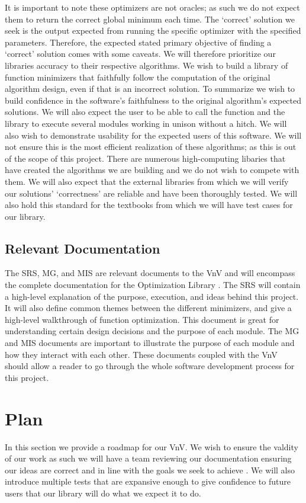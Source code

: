 \documentclass[12pt, titlepage]{article}
\begin{document}
It is important to note these optimizers are not oracles; as such we do not
expect them to return the correct global minimum each time. The `correct' solution we seek is the output expected from running
the specific optimizer with the specified parameters. Therefore, the expected stated primary objective of finding a `correct' 
solution comes with some caveats. We will therefore prioritize our libraries accuracy to their respective algorithms. We wish
to build a library of function minimizers that faithfully follow the computation of the original algorithm design, even if that
is an incorrect solution.  To summarize we wish to build confidence in the software's faithfulness to the original algorithm's 
expected solutions. We will also expect the user to be able to call the function and the library to execute several modules working
in unison without a hitch. 
We will also wish to demonstrate usability for the expected users of this software. We will not ensure this is the most efficient 
realization of these algorithms; as this is out of the scope of this project. There are numerous high-computing libaries that have
created the algorithms we are building and we do not wish to compete with them. We will also expect that the external libraries from 
which we will verify our solutions' `correctness' are reliable and have been thoroughly tested. We will also hold this standard for
the textbooks from which we will have test cases for our library. 


\subsection{Relevant Documentation}
The SRS, MG, and MIS are relevant documents to the VnV and will encompass the complete
documentation for the Optimization Library \citep{SRS}. The SRS will contain a high-level explanation
of the purpose, execution, and ideas behind this project. It will also define common themes
between the different minimizers, and give a high-level walkthrough of function optimization. 
This document is great for understanding certain design decisions and the purpose of each module.
The MG and MIS documents are important to illustrate the purpose of each module and how they
interact with each other. These documents coupled with the VnV should allow a reader to go through 
the whole software development process for this project.



\section{Plan}
In this section we provide a roadmap for our VnV. We wish to ensure the valdity of our work
as such we will have a team reviewing our documentation ensuring our ideas are correct and in 
line with the goals we seek to achieve \citep{SRS}. We will also introduce multiple tests that 
are expansive enough to give confidence to future users that our library will do what we expect
it to do. 
\end{document}
